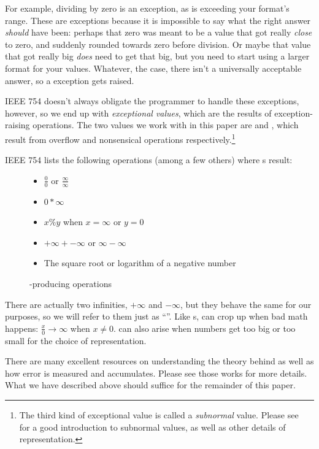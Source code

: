 \documentclass{juliacon}
\begin{document}
For example, dividing by zero is an exception, as is exceeding your \fp{} format's range.
These are exceptions because it is impossible to say what the right answer \emph{should} have been: perhaps that zero was meant to be a value that got really \emph{close} to zero, and suddenly rounded towards zero before division.
Or maybe that value that got really big \emph{does} need to get that big, but you need to start using a larger format for your \fp{} values.
Whatever, the case, there isn't a universally acceptable answer, so a \fp{} exception gets raised.

IEEE 754 doesn't always obligate the programmer to handle these exceptions, however, so we end up with \emph{exceptional values}, which are the results of exception-raising operations.
The two values we work with in this paper are \Inf{} and \NaN{}, which result from overflow and nonsensical operations respectively.\footnote{The third kind of exceptional value is called a \emph{subnormal} value. Please see~\cite{torontoPracticallyAccurateFloatingPoint2014} for a good introduction to subnormal values, as well as other details of \fp{} representation.}

IEEE 754 lists the following operations (among a few others) where \NaN{}s result:

\begin{figure}[h]
  \label{fig:nan-gens}
  \begin{itemize}
  \item $\frac{0}{0}$ or $\frac{\infty}{\infty}$
  \item $0 * \infty$
  \item $x \% y$ when $x = \infty$ or $y = 0$
  \item $+\infty + -\infty$ or $\infty - \infty$
  \item The square root or logarithm of a negative number
  \end{itemize}
  \caption{\NaN{}-producing operations}
\end{figure}

There are actually two infinities, $+\infty$ and $-\infty$, but they behave the same for our purposes, so we will refer to them just as ``\Inf{}''.
Like \NaN{}s, \Inf{} can crop up when bad math happens: $\frac{x}{0} \rightarrow \infty$ when $x \ne 0$.
\Inf{} can also arise when numbers get too big or too small for the choice of representation.

There are many excellent resources\cite{knuthArtComputerProgramming1997,torontoPracticallyAccurateFloatingPoint2014} on understanding the theory behind \fp{} as well as how error is measured and accumulates.
Please see those works for more details.
What we have described above should suffice for the remainder of this paper.
\end{document}
